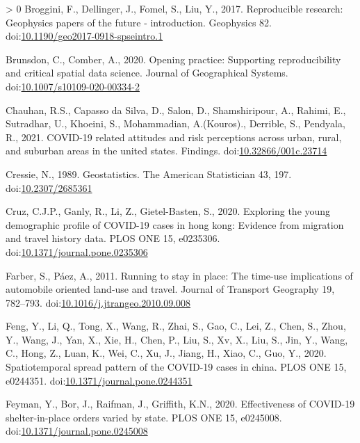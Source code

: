 \documentclass[]{elsarticle} %
\newlength{\cslhangindent}
\newenvironment{CSLReferences}[3] %
 {%
  \setlength{\parindent}{0pt}
  \ifodd #1 \everypar{\setlength{\hangindent}{\cslhangindent}}\ignorespaces\fi
  \ifnum #2 > 0
  \setlength{\parskip}{#2\baselineskip}
  \fi
 }%
 {}
\begin{document}
\begin{CSLReferences}{1}{0}
\leavevmode\hypertarget{ref-Broggini2017reproducible}{}%
Broggini, F., Dellinger, J., Fomel, S., Liu, Y., 2017. Reproducible
research: Geophysics papers of the future - introduction. Geophysics 82.
doi:\href{https://doi.org/10.1190/geo2017-0918-spseintro.1}{10.1190/geo2017-0918-spseintro.1}

\leavevmode\hypertarget{ref-Brunsdon2020opening}{}%
Brunsdon, C., Comber, A., 2020. Opening practice: Supporting
reproducibility and critical spatial data science. Journal of
Geographical Systems.
doi:\href{https://doi.org/10.1007/s10109-020-00334-2}{10.1007/s10109-020-00334-2}

\leavevmode\hypertarget{ref-Chauhan2021covid}{}%
Chauhan, R.S., Capasso da Silva, D., Salon, D., Shamshiripour, A.,
Rahimi, E., Sutradhar, U., Khoeini, S., Mohammadian, A.(Kouros).,
Derrible, S., Pendyala, R., 2021. COVID-19 related attitudes and risk
perceptions across urban, rural, and suburban areas in the united
states. Findings.
doi:\href{https://doi.org/10.32866/001c.23714}{10.32866/001c.23714}

\leavevmode\hypertarget{ref-Cressie1989geostatistics}{}%
Cressie, N., 1989. Geostatistics. The American Statistician 43, 197.
doi:\href{https://doi.org/10.2307/2685361}{10.2307/2685361}

\leavevmode\hypertarget{ref-Cruz2020exploring}{}%
Cruz, C.J.P., Ganly, R., Li, Z., Gietel-Basten, S., 2020. Exploring the
young demographic profile of COVID-19 cases in hong kong: Evidence from
migration and travel history data. PLOS ONE 15, e0235306.
doi:\href{https://doi.org/10.1371/journal.pone.0235306}{10.1371/journal.pone.0235306}

\leavevmode\hypertarget{ref-Farber2011running}{}%
Farber, S., Páez, A., 2011. Running to stay in place: The time-use
implications of automobile oriented land-use and travel. Journal of
Transport Geography 19, 782--793.
doi:\href{https://doi.org/10.1016/j.jtrangeo.2010.09.008}{10.1016/j.jtrangeo.2010.09.008}

\leavevmode\hypertarget{ref-Feng2020spread}{}%
Feng, Y., Li, Q., Tong, X., Wang, R., Zhai, S., Gao, C., Lei, Z., Chen,
S., Zhou, Y., Wang, J., Yan, X., Xie, H., Chen, P., Liu, S., Xv, X.,
Liu, S., Jin, Y., Wang, C., Hong, Z., Luan, K., Wei, C., Xu, J., Jiang,
H., Xiao, C., Guo, Y., 2020. Spatiotemporal spread pattern of the
COVID-19 cases in china. PLOS ONE 15, e0244351.
doi:\href{https://doi.org/10.1371/journal.pone.0244351}{10.1371/journal.pone.0244351}

\leavevmode\hypertarget{ref-Feyman2020effectiveness}{}%
Feyman, Y., Bor, J., Raifman, J., Griffith, K.N., 2020. Effectiveness of
COVID-19 shelter-in-place orders varied by state. PLOS ONE 15, e0245008.
doi:\href{https://doi.org/10.1371/journal.pone.0245008}{10.1371/journal.pone.0245008}


\end{CSLReferences}
\end{document}
